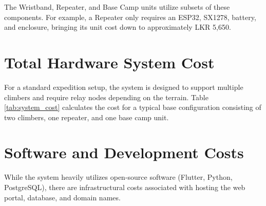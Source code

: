 \begin{infobox}
The Wristband, Repeater, and Base Camp units utilize subsets of these components. For example, a Repeater only requires an ESP32, SX1278, battery, and enclosure, bringing its unit cost down to approximately LKR 5,650.
\end{infobox}

\section{Total Hardware System Cost}

For a standard expedition setup, the system is designed to support multiple climbers and require relay nodes depending on the terrain. Table \ref{tab:system_cost} calculates the cost for a typical base configuration consisting of two climbers, one repeater, and one base camp unit.

\begin{table}[htbp]
    \centering
    \caption{Hardware Cost for a Standard Expedition Setup}
    \label{tab:system_cost}
\end{table}

\section{Software and Development Costs}

While the system heavily utilizes open-source software (Flutter, Python, PostgreSQL), there are infrastructural costs associated with hosting the web portal, database, and domain names.

